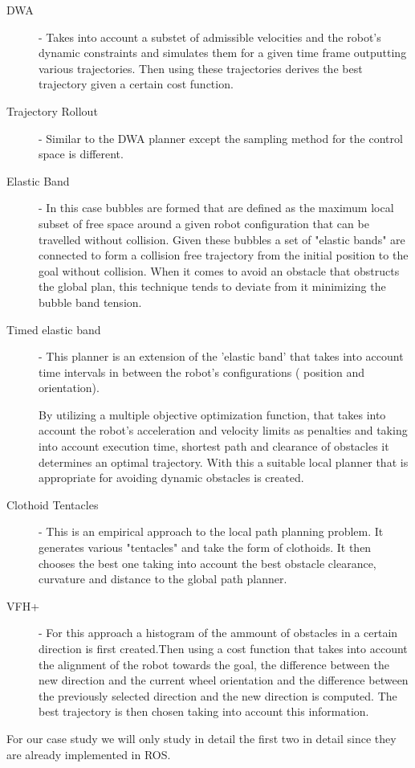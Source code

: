 \begin{description}
    \item [\ac{DWA}] -  \cite{foxdwa} Takes into account a substet of admissible velocities and the robot's dynamic constraints and simulates them for a given time frame outputting various trajectories. Then using these trajectories derives the best trajectory given a certain cost function.  
    \item [Trajectory Rollout]  \cite{gerkey2008planning} - Similar to the \ac{DWA} planner except the sampling method for the control space is different.
    \item [Elastic Band] - \cite{siegwart2011introduction} In this case bubbles are formed that are defined as the maximum local subset of free space around a given robot configuration that can be travelled without collision.
    Given these bubbles a set of "elastic bands" are connected to form a collision free trajectory from the initial position to the goal without collision. When it comes to avoid an obstacle that obstructs the global plan, this technique tends to deviate from it  minimizing the bubble band tension.
    \item [Timed elastic band] - \cite{rosmann2013efficient} This planner is an extension of the 'elastic band' that takes into account time intervals in between the robot's configurations ( position and orientation). 
    
    By utilizing a  multiple objective optimization function, that takes into account the robot's acceleration and velocity limits as penalties and  taking into account execution time, shortest path and clearance of obstacles it determines an optimal trajectory. With this a suitable local planner that is appropriate for avoiding dynamic obstacles is created.
    
    \item [Clothoid Tentacles] -  \cite{ffalia2015local} This is an empirical approach to the local path planning problem. It generates various "tentacles" and take the form of clothoids. It then chooses the best one taking into account the best obstacle clearance, curvature and distance to the global path planner. 
    
    \item [\ac{VFH}+] \cite{siegwart2011introduction} - For this approach a histogram of the ammount of obstacles in a certain direction is first created.Then using a cost function that takes into account the alignment of the robot towards the goal, the difference between the new direction and the current wheel orientation and the difference between the previously selected direction and the new direction is computed. The best trajectory is then chosen taking into account this information.
    
\end{description}
For our case study we will only study in detail the first two in detail since they are already implemented in ROS.
